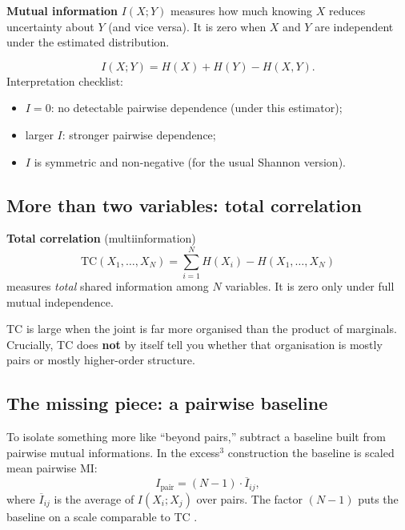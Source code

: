 \documentclass[11pt,a4paper]{article}
\begin{document}
\begin{defbox}
\textbf{Mutual information} $I(X;Y)$ measures how much knowing $X$ reduces
uncertainty about $Y$ (and vice versa). It is zero when $X$ and $Y$ are
independent under the estimated distribution.
\end{defbox}

\begin{equation}
I(X;Y)=H(X)+H(Y)-H(X,Y).
\end{equation}
Interpretation checklist:
\begin{itemize}[leftmargin=*,itemsep=2pt]
  \item $I=0$: no detectable pairwise dependence (under this estimator);
  \item larger $I$: stronger pairwise dependence;
  \item $I$ is symmetric and non-negative (for the usual Shannon version).
\end{itemize}

\subsection{More than two variables: total correlation}

\begin{defbox}
\textbf{Total correlation} (multiinformation)
\[
\mathrm{TC}(X_1,\ldots,X_N)
=
\sum_{i=1}^{N}H(X_i)-H(X_1,\ldots,X_N)
\]
measures \emph{total} shared information among $N$ variables. It is zero
only under full mutual independence.
\end{defbox}

TC is large when the joint is far more organised than the product of
marginals. Crucially, TC does \textbf{not} by itself tell you whether that
organisation is mostly pairs or mostly higher-order structure.

\subsection{The missing piece: a pairwise baseline}

To isolate something more like ``beyond pairs,'' subtract a baseline built
from pairwise mutual informations. In the excess$^3$ construction the
baseline is scaled mean pairwise MI:
\begin{equation}
I_{\mathrm{pair}}
=
(N-1)\cdot
\overline{I}_{ij},
\end{equation}
where $\overline{I}_{ij}$ is the average of $I(X_i;X_j)$ over pairs. The
factor $(N-1)$ puts the baseline on a scale comparable to TC
\citep{Padilla2026framework,Padilla2026excess3}.
\end{document}
